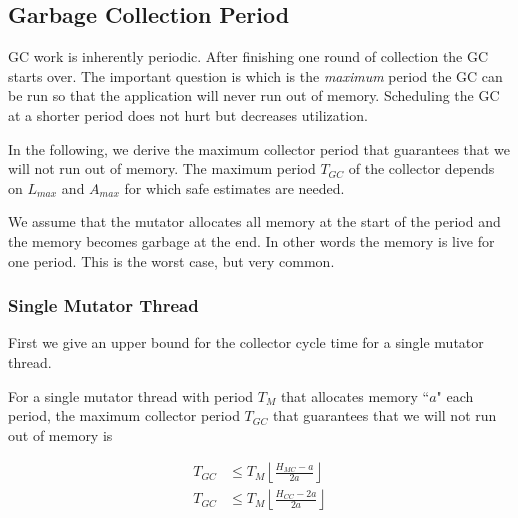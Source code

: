 \subsection{Garbage Collection Period}

GC work is inherently periodic. After finishing one round of
collection the GC starts over. The important question is which is
the \emph{maximum} period the GC can be run so that the application
will never run out of memory. Scheduling the GC at a shorter period
does not hurt but decreases utilization.

In the following, we derive the maximum collector period that
guarantees that we will not run out of memory. The maximum period
$T_{GC}$ of the collector depends on $L_{max}$ and $A_{max}$ for
which safe estimates are needed.

We assume that the mutator allocates all memory at the start of the
period and the memory becomes garbage at the end. In other words the
memory is live for one period. This is the worst case, but very
common.

\subsubsection{Single Mutator Thread}

First we give an upper bound for the collector cycle time for a
single mutator thread.

\begin{lemma}

For a single mutator thread with period $T_M$ that allocates memory
``$a$" each period, the maximum collector period $T_{GC}$ that
guarantees that we will not run out of memory is

\begin{align}\label{sth:mc:lemma}
    T_{GC} & \le T_M\left\lfloor\frac{H_{MC}-a}{2a}\right\rfloor\\
    \label{sth:cc:lemma}
    T_{GC} & \le T_M\left\lfloor\frac{H_{CC}-2a}{2a}\right\rfloor
\end{align}

\end{lemma}

